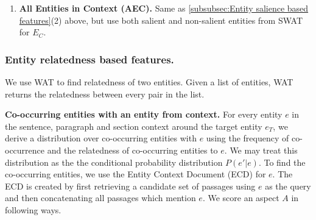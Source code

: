 \documentclass[sigconf,authordraft]{acmart}
\begin{document}
\begin{enumerate}
    \item \textbf{All Entities in Context (AEC).} Same as \ref{subsubsec:Entity salience based features}(2) above, but use both salient and non-salient entities from SWAT for $E_C$.
    
\end{enumerate}


\subsubsection{Entity relatedness based features.} 
\label{subsubsec:Entity relatedness based features}
We use WAT \cite{piccinno2014wat} to find relatedness of two entities. Given a list of entities, WAT returns the relatedness between every pair in the list.


\textbf{Co-occurring entities with an entity from context.}
For every entity $e$ in the sentence, paragraph and section context around the target entity $e_T$, we derive a distribution over co-occurring entities with $e$ using the frequency of co-occurrence and the relatedness of co-occurring entities to $e$. We may treat this distribution as the the conditional probability distribution $P(e' \vert e)$. To find the co-occurring entities, we use the Entity Context Document (ECD) \cite{chatterjee2019why} for $e$. The ECD is created by first retrieving a candidate set of passages using $e$ as the query and then concatenating all passages which mention $e$.
We score an aspect $A$ in following ways.
\end{document}

